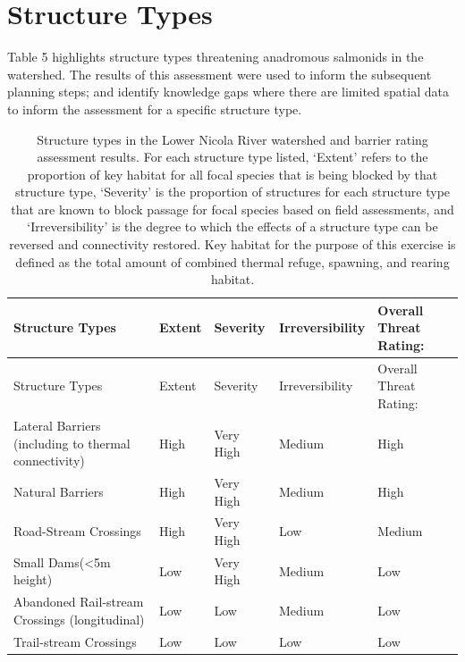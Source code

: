 \documentclass[
  letterpaper,
  DIV=11,
  numbers=noendperiod]{scrreprt}
\begin{document}
\hypertarget{structure-types}{%
\section*{Structure Types}\label{structure-types}}


Table 5 highlights structure types threatening anadromous salmonids in
the watershed. The results of this assessment were used to inform the
subsequent planning steps; and identify knowledge gaps where there are
limited spatial data to inform the assessment for a specific structure
type.

\hypertarget{tbl-barriertype}{}
\begin{longtable}[]{@{}lllll@{}}
\caption{\label{tbl-barriertype}Structure types in the Lower Nicola
River watershed and barrier rating assessment results. For each
structure type listed, `Extent' refers to the proportion of key habitat
for all focal species that is being blocked by that structure type,
`Severity' is the proportion of structures for each structure type that
are known to block passage for focal species based on field assessments,
and `Irreversibility' is the degree to which the effects of a structure
type can be reversed and connectivity restored. Key habitat for the
purpose of this exercise is defined as the total amount of combined
thermal refuge, spawning, and rearing
habitat.}\label{T_e37b1}\tabularnewline
\toprule\noalign{}
Structure Types & Extent & Severity & Irreversibility & Overall Threat
Rating: \\
\midrule\noalign{}
\endfirsthead
\toprule\noalign{}
Structure Types & Extent & Severity & Irreversibility & Overall Threat
Rating: \\
\midrule\noalign{}
\endhead
\bottomrule\noalign{}
\endlastfoot
Lateral Barriers (including to thermal connectivity) & High & Very High
& Medium & High \\
Natural Barriers & High & Very High & Medium & High \\
Road-Stream Crossings & High & Very High & Low & Medium \\
Small Dams(\textless5m height) & Low & Very High & Medium & Low \\
Abandoned Rail-stream Crossings (longitudinal) & Low & Low & Medium &
Low \\
Trail-stream Crossings & Low & Low & Low & Low \\
\end{longtable}
\end{document}
